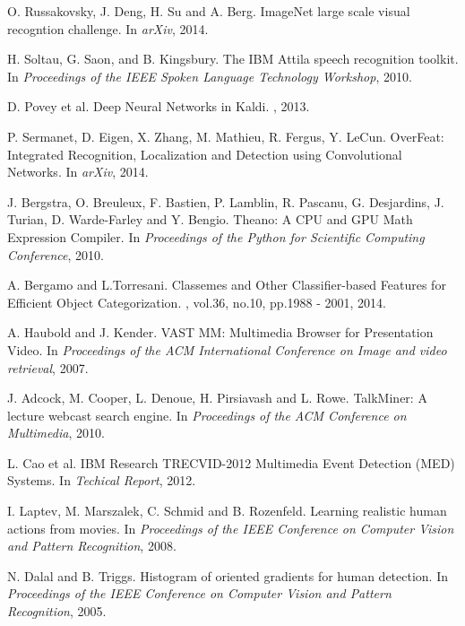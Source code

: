 \documentclass[11pt,twocolumn,twoside]{IEEEtran}
\begin{document}
\begin{thebibliography}{1}
O. Russakovsky, J. Deng, H. Su and A. Berg.
\newblock ImageNet large scale visual recogntion challenge.
\newblock In {\em arXiv}, 2014.


H. Soltau, G. Saon, and B. Kingsbury.
\newblock The IBM Attila speech recognition toolkit.
\newblock In {\em Proceedings of the IEEE Spoken Language Technology Workshop}, 2010.


D. Povey et al.
\newblock Deep Neural Networks in Kaldi.
, 2013.

P. Sermanet, D. Eigen, X. Zhang, M. Mathieu, R. Fergus, Y. LeCun.
\newblock OverFeat: Integrated Recognition, Localization and Detection using Convolutional Networks.
\newblock In {\em arXiv}, 2014.


J. Bergstra, O. Breuleux, F. Bastien, P. Lamblin, R. Pascanu, G. Desjardins, J. Turian, D. Warde-Farley and Y. Bengio.
\newblock Theano: A CPU and GPU Math Expression Compiler.
\newblock In {\em Proceedings of the Python for Scientific Computing Conference}, 2010.


A. Bergamo and  L.Torresani.
\newblock Classemes and Other Classifier-based Features for Efficient Object Categorization.
, vol.36, no.10, pp.1988 - 2001, 2014.


A. Haubold and J. Kender.
\newblock VAST MM: Multimedia Browser for Presentation Video.
\newblock In {\em Proceedings of the ACM International Conference on Image and video retrieval}, 2007.

J. Adcock, M. Cooper, L. Denoue, H. Pirsiavash and L. Rowe.
\newblock TalkMiner: A lecture webcast search engine.
\newblock In {\em Proceedings of the ACM Conference on Multimedia}, 2010.

L. Cao et al.
\newblock IBM Research TRECVID-2012 Multimedia Event Detection (MED) Systems.
\newblock In {\em Techical Report}, 2012.

I. Laptev, M. Marszalek, C. Schmid and B. Rozenfeld.
\newblock Learning realistic human actions from movies.
\newblock In {\em Proceedings of the IEEE Conference on Computer Vision and Pattern Recognition}, 2008.


N. Dalal and B. Triggs.
\newblock Histogram of oriented gradients for human detection.
\newblock In {\em Proceedings of the IEEE Conference on Computer Vision and Pattern Recognition}, 2005.



\end{thebibliography}
\end{document}
